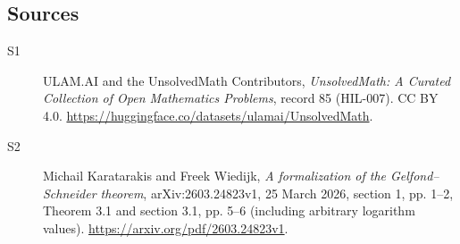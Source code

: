 \documentclass[11pt]{article}
\begin{document}
\subsection{Sources}
\begin{description}
\item[\hypertarget{source:85:1}{S1}] ULAM.AI and the UnsolvedMath Contributors, \emph{UnsolvedMath: A Curated Collection of Open Mathematics Problems}, record 85 (HIL-007). CC BY 4.0. \url{https://huggingface.co/datasets/ulamai/UnsolvedMath}.
\item[\hypertarget{source:85:2}{S2}] Michail Karatarakis and Freek Wiedijk, \emph{A formalization of the Gelfond--Schneider theorem}, arXiv:2603.24823v1, 25 March 2026, section 1, pp. 1--2, Theorem 3.1 and section 3.1, pp. 5--6 (including arbitrary logarithm values). \url{https://arxiv.org/pdf/2603.24823v1}.
\end{description}
\label{end:85}
\end{document}
